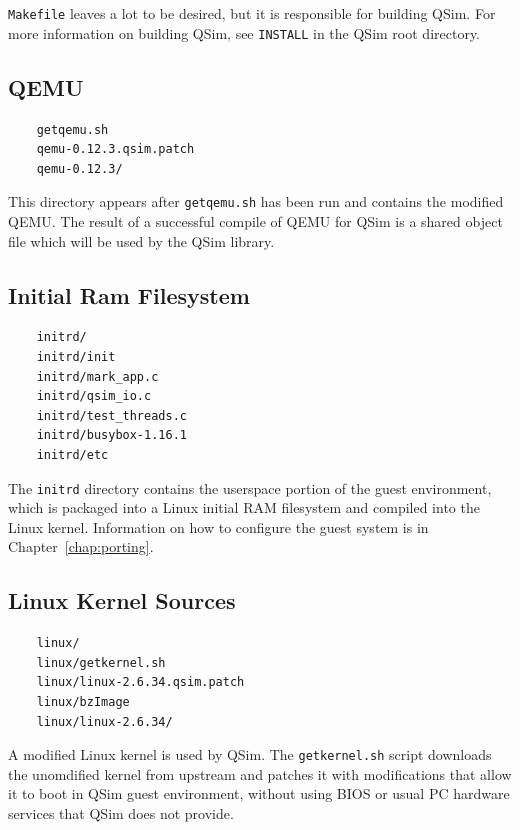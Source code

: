 \documentclass[letterpaper, 10pt]{book}
\begin{document}
\texttt{Makefile} leaves a lot to be desired, but it is responsible for
building QSim. For more information on building QSim, see \texttt{INSTALL} in
the QSim root directory. 

\subsection{QEMU}
\begin{verbatim}
    getqemu.sh
    qemu-0.12.3.qsim.patch
    qemu-0.12.3/
\end{verbatim}
This directory appears after \texttt{getqemu.sh} has been run and contains the
modified QEMU. The result of a successful compile of QEMU for QSim is a shared
object file which will be used by the QSim library.

\subsection{Initial Ram Filesystem}
\begin{verbatim}
    initrd/
    initrd/init
    initrd/mark_app.c
    initrd/qsim_io.c
    initrd/test_threads.c
    initrd/busybox-1.16.1
    initrd/etc
\end{verbatim}
The \texttt{initrd} directory contains the userspace portion of the guest
environment, which is packaged into a Linux initial RAM filesystem and compiled
into the Linux kernel. Information on how to configure the guest system is in
Chapter~\ref{chap:porting}.

\subsection{Linux Kernel Sources}
\begin{verbatim}
    linux/
    linux/getkernel.sh
    linux/linux-2.6.34.qsim.patch
    linux/bzImage
    linux/linux-2.6.34/
\end{verbatim}
A modified Linux kernel is used by QSim. The \texttt{getkernel.sh} script
downloads the unomdified kernel from upstream and patches it with modifications
that allow it to boot in QSim guest environment, without using BIOS or usual PC
hardware services that QSim does not provide.
\end{document}
